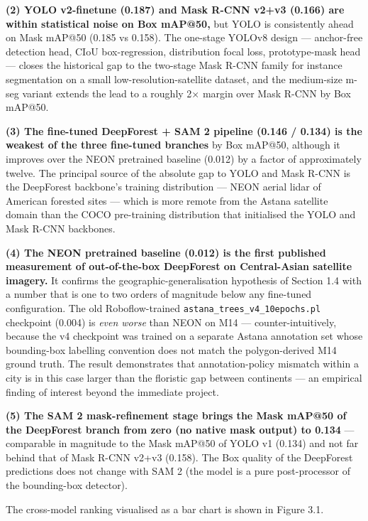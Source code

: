 \textbf{(2) YOLO v2-finetune (0.187) and Mask R-CNN v2+v3 (0.166) are within statistical noise on Box mAP@50,} but YOLO is consistently ahead on Mask mAP@50 (0.185 vs 0.158). The one-stage YOLOv8 design --- anchor-free detection head, CIoU box-regression, distribution focal loss, prototype-mask head --- closes the historical gap to the two-stage Mask R-CNN family for instance segmentation on a small low-resolution-satellite dataset, and the medium-size m-seg variant extends the lead to a roughly 2× margin over Mask R-CNN by Box mAP@50.

\textbf{(3) The fine-tuned DeepForest + SAM 2 pipeline (0.146 / 0.134) is the weakest of the three fine-tuned branches} by Box mAP@50, although it improves over the NEON pretrained baseline (0.012) by a factor of approximately twelve. The principal source of the absolute gap to YOLO and Mask R-CNN is the DeepForest backbone's training distribution --- NEON aerial lidar of American forested sites --- which is more remote from the Astana satellite domain than the COCO pre-training distribution that initialised the YOLO and Mask R-CNN backbones.

\textbf{(4) The NEON pretrained baseline (0.012) is the first published measurement of out-of-the-box DeepForest on Central-Asian satellite imagery.} It confirms the geographic-generalisation hypothesis of Section 1.4 with a number that is one to two orders of magnitude below any fine-tuned configuration. The old Roboflow-trained \texttt{astana\_trees\_v4\_10epochs.pl} checkpoint (0.004) is \emph{even worse} than NEON on M14 --- counter-intuitively, because the v4 checkpoint was trained on a separate Astana annotation set whose bounding-box labelling convention does not match the polygon-derived M14 ground truth. The result demonstrates that annotation-policy mismatch within a city is in this case larger than the floristic gap between continents --- an empirical finding of interest beyond the immediate project.

\textbf{(5) The SAM 2 mask-refinement stage brings the Mask mAP@50 of the DeepForest branch from zero (no native mask output) to 0.134} --- comparable in magnitude to the Mask mAP@50 of YOLO v1 (0.134) and not far behind that of Mask R-CNN v2+v3 (0.158). The Box quality of the DeepForest predictions does not change with SAM 2 (the model is a pure post-processor of the bounding-box detector).

The cross-model ranking visualised as a bar chart is shown in Figure 3.1.

